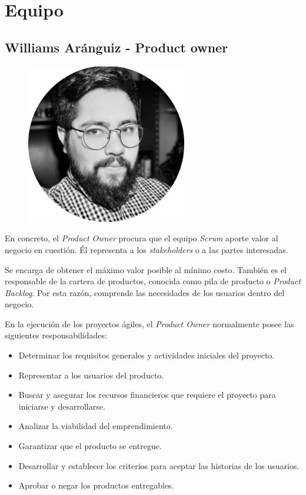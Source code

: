 \section{Equipo}
\subsection{Williams Aránguiz - Product owner}
\begin{figure}[h!]
\centering
\includegraphics[width=7cm]{Figuras/Williams.png}
\end{figure}

En concreto, el \textit{Product Owner} procura que el equipo \textit{Scrum} aporte valor al negocio en cuestión. Él representa a los \textit{stakeholders} o a las partes interesadas.

Se encarga de obtener el máximo valor posible al mínimo costo. También es el responsable de la cartera de productos, conocida como pila de producto o \textit{Product Backlog}.  Por esta razón,  comprende las necesidades de los usuarios dentro del negocio.

En la ejecución de los proyectos ágiles, el \textit{Product Owner} normalmente posee las siguientes responsabilidades:

\begin{itemize}
\item Determinar los requisitos generales y actividades iniciales del proyecto.
\item Representar a los usuarios del producto.
\item Buscar y asegurar los recursos financieros que requiere el proyecto para iniciarse y desarrollarse.
\item Analizar la viabilidad del emprendimiento.
\item Garantizar que el producto se entregue.
\item Desarrollar y establecer los criterios para aceptar las historias de los usuarios.
\item Aprobar o negar los productos entregables.
\end{itemize}




